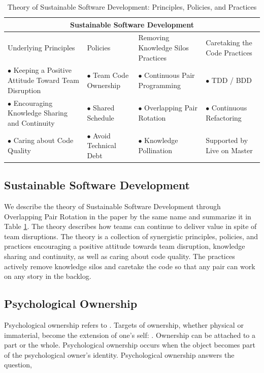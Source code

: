 \begin{table}[t]
\renewcommand{\arraystretch}{1.5}
\centering
\caption{Theory of Sustainable Software Development: Principles, Policies, and Practices}
\label{SustainableSoftwareDevelopmentTable}
\begin{tabular}{|p{1.65in}|p{1.35in}|p{1.8in}|p{1.6in}|}
\hline
\multicolumn{4}{|c|}{Sustainable Software Development}                     \\
\hline
Underlying Principles & Policies                  & Removing Knowledge Silos Practices & Caretaking the Code Practices       \\
$\bullet$ Keeping a Positive Attitude Toward Team Disruption & $\bullet$ Team Code Ownership & $\bullet$ Continuous Pair Programming         & $\bullet$  TDD / BDD                   \\
$\bullet$ Encouraging Knowledge Sharing and Continuity & $\bullet$ Shared Schedule           & $\bullet$ Overlapping Pair Rotation & $\bullet$ Continuous Refactoring      \\
$\bullet$ Caring about Code Quality  & $\bullet$ Avoid Technical Debt      & $\bullet$  Knowledge Pollination    & Supported by Live on Master \\ 
\hline
\end{tabular}
\end{table}

\subsection{Sustainable Software Development}
\label{SustainableSoftwareDevelopmentTheory}
We describe the theory of Sustainable Software Development through Overlapping Pair Rotation in the paper by the same name \cite{SustainableSoftwareDevelopment} and summarize it in Table \ref{SustainableSoftwareDevelopmentTable}. The theory describes how teams can continue to deliver value in spite of team disruptions. The theory is a collection of synergistic principles, policies, and practices encouraging a positive attitude towards team disruption, knowledge sharing and continuity, as well as caring about code quality. The practices actively remove knowledge silos and caretake the code so that any pair can work on any story in the backlog. 

\subsection{Psychological Ownership}
Psychological ownership refers to  \cite{Pierce2001}. Targets of ownership, whether physical or immaterial, become the extension of one's self:  \cite{Isaacs1933}. Ownership can be attached to a part or the whole. Psychological ownership occurs when the object becomes part of the psychological owner's identity. Psychological ownership answers the question, 

